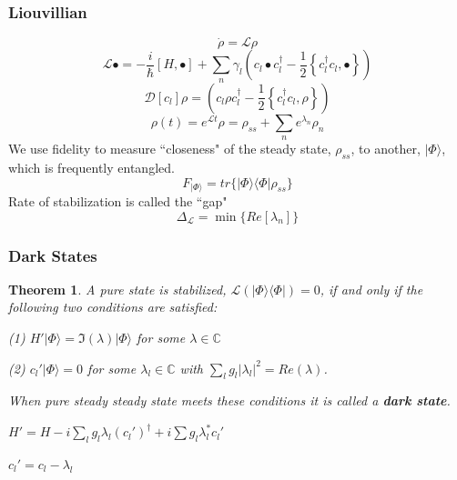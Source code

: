 \documentclass{beamer}
\newtheorem{thm}{Theorem}
\begin{document}
\begin{frame}
\frametitle{Liouvillian}
\begin{equation}
\dot{\rho} = \mathcal{L} \rho \nonumber
\end{equation}
\begin{equation}\label{Liovuillian}
\mathcal{L}\bullet = - \frac{i}{\hbar} [ H , \bullet ] + \sum_n \gamma_l \left( c_l \bullet c_l^\dagger - \frac{1}{2} \left\lbrace c_l^\dagger c_l , \bullet \right\rbrace \right)\nonumber
\end{equation}
\begin{equation}
\mathcal{D}[c_l] \rho = \left( c_l \rho c_l^\dagger - \frac{1}{2} \left\lbrace c_l^\dagger c_l , \rho \right\rbrace \right) \nonumber 
\end{equation}
\begin{equation}
\rho(t) = e^{\mathcal{L}t} \rho = \rho_{ss} +  \sum_n e^{\lambda_n} \rho_n \nonumber
\end{equation}
We use fidelity to measure ``closeness" of the steady state, $\rho_{ss}$, to another, $|\Phi \rangle$, which is frequently entangled.
\begin{equation}
F_{| \Phi \rangle} = tr \lbrace | \Phi \rangle \langle \Phi |  \rho_{ss} \rbrace \nonumber
\end{equation}
Rate of stabilization is called the ``gap"
\begin{equation}
\Delta_{\mathcal{L}} = \min\{Re[\lambda_{n}]\}
\end{equation}
\end{frame}

\begin{frame}
\frametitle{Dark States}

\begin{thm}\label{Theorem}
A pure state is stabilized, $\mathcal{L}\left( |\Phi \rangle \langle \Phi |  \right)=0$, if and only if the following two conditions are satisfied: 

(1) $H' | \Phi \rangle = \Im( \lambda )| \Phi \rangle$ for some $\lambda \in \mathbb{C}$

(2) $c_l' | \Phi \rangle = 0$ for some $\lambda_l \in \mathbb{C}$ with $\sum_l g_l |\lambda_l|^ 2 = Re ( \lambda ) $.

When pure steady steady state meets these conditions it is called a \textbf{dark state}.

\end{thm}

$H' = H - i \sum_l g_l \lambda_l (c_l')^\dagger + i \sum g_l \lambda_l^* c_l'$

$c_l' = c_l - \lambda_l$


\end{frame}
\end{document}

